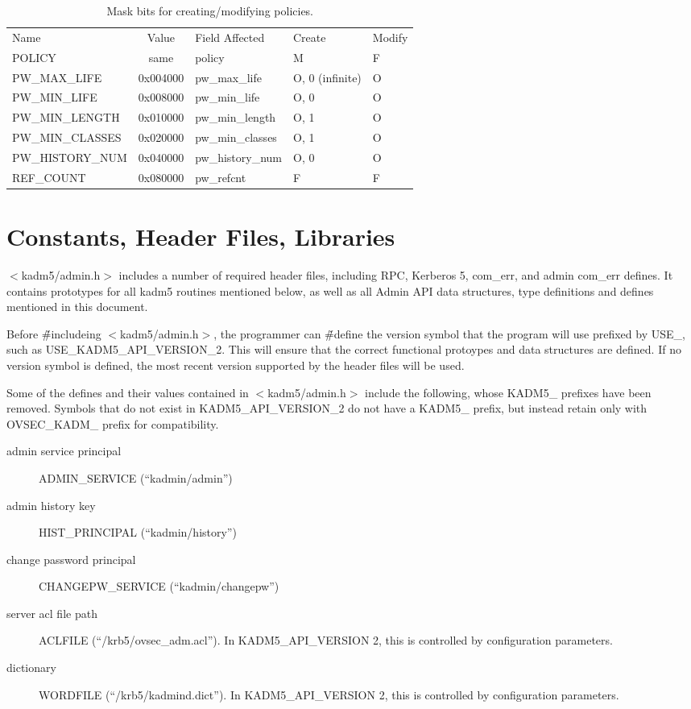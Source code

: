 \begin{table}[htbp]
\begin{tabular}{@{}lclll}
Name & Value & Field Affected & Create & Modify \\
POLICY                  & same     & policy & M & F \\
PW_MAX_LIFE             & 0x004000 & pw_max_life & O, 0 (infinite) & O \\
PW_MIN_LIFE             & 0x008000 & pw_min_life & O, 0 & O \\
PW_MIN_LENGTH           & 0x010000 & pw_min_length & O, 1 & O \\
PW_MIN_CLASSES          & 0x020000 & pw_min_classes & O, 1 & O \\
PW_HISTORY_NUM          & 0x040000 & pw_history_num & O, 0 & O \\
REF_COUNT               & 0x080000 & pw_refcnt & F & F
\end{tabular}
\caption{Mask bits for creating/modifying policies.}
\label{tab:policy-bits}
\end{table}

\section{Constants, Header Files, Libraries}

$<$kadm5/admin.h$>$ includes a number of required header files,
including RPC, Kerberos 5, com_err, and admin com_err
defines.  It contains prototypes for all kadm5 routines mentioned
below, as well as all Admin API data structures, type definitions and
defines mentioned in this document.  

Before \v{\#include}ing $<$kadm5/admin.h$>$, the programmer can
\v{\#define} the version symbol that the program will use prefixed by
USE_, such as USE_KADM5_API_VERSION_2.  This will ensure that the
correct functional protoypes and data structures are defined.  If no
version symbol is defined, the most recent version supported by the
header files will be used.

Some of the defines and their values contained in $<$kadm5/admin.h$>$
include the following, whose KADM5_ prefixes have been removed.
Symbols that do not exist in KADM5_API_VERSION_2 do not have a KADM5_
prefix, but instead retain only with OVSEC_KADM_ prefix for
compatibility.
\begin{description}
\item[admin service principal] ADMIN_SERVICE (``kadmin/admin'')
\item[admin history key] HIST_PRINCIPAL (``kadmin/history'')
\item[change password principal] CHANGEPW_SERVICE (``kadmin/changepw'')
\item[server acl file path] ACLFILE (``/krb5/ovsec_adm.acl'').  In
KADM5_API_VERSION 2, this is controlled by configuration parameters.
\item[dictionary] WORDFILE (``/krb5/kadmind.dict'').    In
KADM5_API_VERSION 2, this is controlled by configuration parameters.
\end{description}

